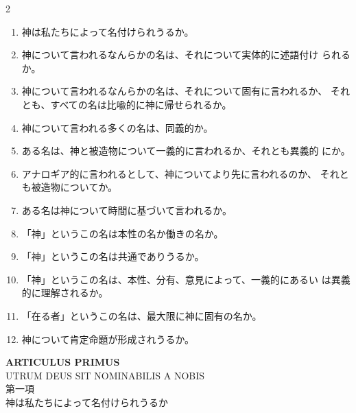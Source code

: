 \documentclass[paper=a4paper,fontsize=10pt,jafontsize=9pt,titlepage]{jlreq}
\begin{document}
\begin{paracol}{2}
\vspace{1.3em}
\begin{enumerate}
 \item 神は私たちによって名付けられうるか。
 \item 神について言われるなんらかの名は、それについて実体的に述語付け
 られるか。
 \item 神について言われるなんらかの名は、それについて固有に言われるか、
       それとも、すべての名は比喩的に神に帰せられるか。
 \item 神について言われる多くの名は、同義的か。
 \item ある名は、神と被造物について一義的に言われるか、それとも異義的
 にか。
 \item アナロギア的に言われるとして、神についてより先に言われるのか、
 それとも被造物についてか。
 \item ある名は神について時間に基づいて言われるか。
 \item 「神」というこの名は本性の名か働きの名か。
 \item 「神」というこの名は共通でありうるか。
 \item 「神」というこの名は、本性、分有、意見によって、一義的にあるい
 は異義的に理解されるか。
 \item 「在る者」というこの名は、最大限に神に固有の名か。
 \item 神について肯定命題が形成されうるか。
\end{enumerate}

\end{paracol}

\newpage
{}
\begin{center}
{\Large {\bfseries ARTICULUS PRIMUS}\\UTRUM DEUS SIT NOMINABILIS A NOBIS}\\
{\large 第一項\\神は私たちによって名付けられうるか}
\end{center}

{}
\setcounter{section}{1}
\setcounter{subsection}{0}
\end{document}
